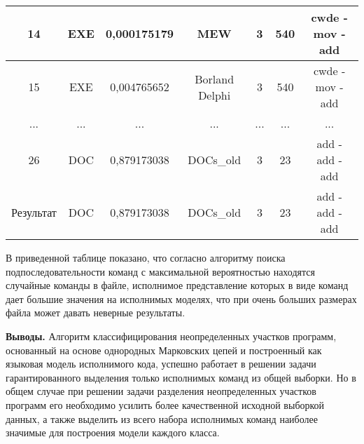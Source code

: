 \documentclass{book}
\begin{document}
\begin{table}[h!]
\begin{tabular}{|c|c|c|c|c|c|c|}
		14        & EXE                                                                  & 0,000175179 & MEW                                                                & 3                                                           & 540                                                        & cwde - mov - add                                                    \\ \hline
		15        & EXE                                                                  & 0,004765652 & Borland Delphi                                                     & 3                                                           & 540                                                        & cwde - mov - add                                                    \\ \hline
		...       & ...                                                                  & ...         & ...                                                                & ...                                                         & ...                                                        & ...                                                                 \\ \hline
		26        & DOC                                                                  & 0,879173038 & DOCs\_old                                                          & 3                                                           & 23                                                         & add - add - add                                                     \\ \hline
		Результат & DOC                                                                  & 0,879173038 & DOCs\_old                                                          & 3                                                           & 23                                                         & add - add - add                                                     \\ \hline
	\end{tabular}
\end{table}

В приведенной таблице показано, что согласно алгоритму поиска подпоследовательности команд 
с максимальной вероятностью находятся случайные команды в файле, исполнимое представление которых 
в виде команд дает большие значения на исполнимых моделях, что при очень больших размерах файла 
может давать неверные результаты. 

\textbf{Выводы.} Алгоритм классифицирования неопределенных участков программ, основанный на 
основе однородных Марковских цепей и построенный как языковая модель исполнимого кода, успешно 
работает в решении задачи гарантированного выделения только исполнимых команд из общей выборки. 
Но в общем случае при решении задачи разделения неопределенных участков программ его необходимо 
усилить более качественной исходной выборкой данных, а также выделить из всего набора исполнимых 
команд наиболее значимые для построения модели каждого класса.
\end{document}
